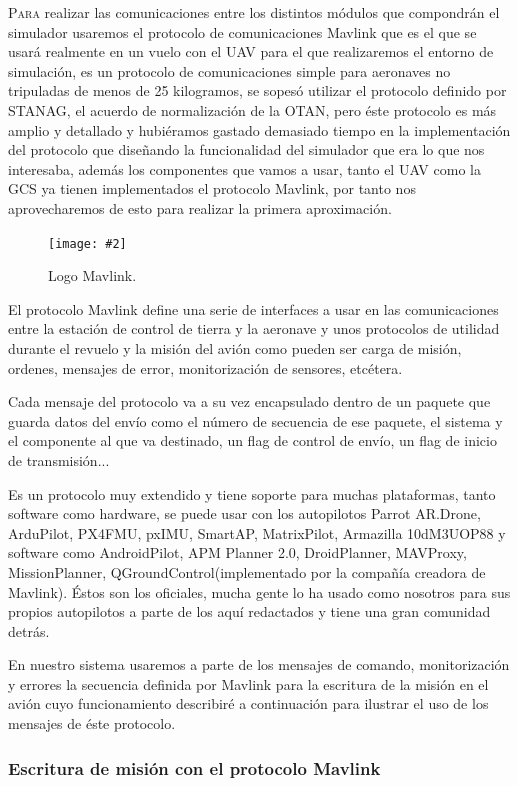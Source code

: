 \documentclass[12pt,a4paper,spanish]{book} %
\newcommand{\imgCentrada}[3]{
\begin{figure}[H]
\begin{center}
\texttt{[image: \#2]}
\caption{#3}
\label{#1}
\end{center}
\end{figure}
}
\begin{document}
\lettrine{P}{ara} realizar las comunicaciones entre los distintos módulos que compondrán el simulador usaremos el protocolo de comunicaciones Mavlink que es el que se usará realmente en un vuelo con el UAV para el que realizaremos el entorno de simulación, es un protocolo de comunicaciones simple para aeronaves no tripuladas de menos de 25 kilogramos, se sopesó utilizar el protocolo definido por STANAG, el acuerdo de normalización de la OTAN, pero éste protocolo es más amplio y detallado y hubiéramos gastado demasiado tiempo en la implementación del protocolo que diseñando la funcionalidad del simulador que era lo que nos interesaba, además los componentes que vamos a usar, tanto el UAV como la GCS ya tienen implementados el protocolo Mavlink, por tanto nos aprovecharemos de esto para realizar la primera aproximación.

\imgCentrada{fig.2.22}{img/mavlink.eps}{Logo Mavlink.}

El protocolo Mavlink define una serie de interfaces a usar en las comunicaciones entre la estación de control de tierra y la aeronave y unos protocolos de utilidad durante el revuelo y la misión del avión como pueden ser carga de misión, ordenes, mensajes de error, monitorización de sensores, etcétera.

Cada mensaje del protocolo va a su vez encapsulado dentro de un paquete que guarda datos del envío como el número de secuencia de ese paquete, el sistema y el componente al que va destinado, un flag de control de envío, un flag de inicio de transmisión...

Es un protocolo muy extendido y tiene soporte para muchas plataformas, tanto software como hardware, se puede usar con los autopilotos Parrot AR.Drone, ArduPilot, PX4FMU, pxIMU, SmartAP, MatrixPilot, Armazilla 10dM3UOP88 y software como AndroidPilot, APM Planner 2.0, DroidPlanner, MAVProxy, MissionPlanner, QGroundControl(implementado por la compañía creadora de Mavlink). Éstos son los oficiales, mucha gente lo ha usado como nosotros para sus propios autopilotos a parte de los aquí redactados y tiene una gran comunidad detrás.

En nuestro sistema usaremos a parte de los mensajes de comando, monitorización y errores la secuencia definida por Mavlink para la escritura de la misión en el avión cuyo funcionamiento describiré a continuación para ilustrar el uso de los mensajes de éste protocolo.

\subsubsection{Escritura de misión con el protocolo Mavlink}
\end{document}
